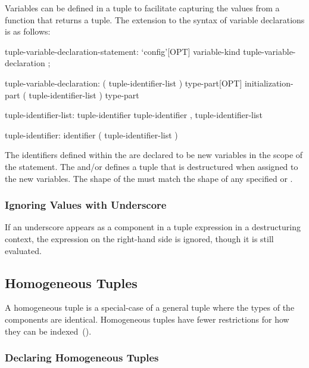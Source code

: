 Variables can be defined in a tuple to facilitate capturing the values
from a function that returns a tuple.  The extension to the syntax of
variable declarations is as follows:
\begin{syntax}
tuple-variable-declaration-statement:
  `config'[OPT] variable-kind tuple-variable-declaration ;

tuple-variable-declaration:
  ( tuple-identifier-list ) type-part[OPT] initialization-part
  ( tuple-identifier-list ) type-part

tuple-identifier-list:
  tuple-identifier
  tuple-identifier , tuple-identifier-list

tuple-identifier:
  identifier
  ( tuple-identifier-list )
\end{syntax}
The identifiers defined within the  are declared
to be new variables in the scope of the statement.  The
 and/or  defines a tuple
that is destructured when assigned to the new variables. The shape of the
 must match the shape of any specified
 or .

\subsubsection{Ignoring Values with Underscore}
\label{Ignoring_Values_with_Underscore}

If an underscore appears as a component in a tuple expression in a
destructuring context, the expression on the right-hand side is
ignored, though it is still evaluated.

\subsection{Homogeneous Tuples}
\label{Homogeneous_Tuples}

A homogeneous tuple is a special-case of a general tuple where the
types of the components are identical.  Homogeneous tuples have fewer
restrictions for how they can be indexed~().

\subsubsection{Declaring Homogeneous Tuples}
\label{Declaring_Homogeneous_Tuples}


